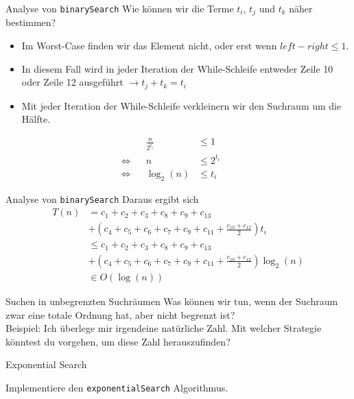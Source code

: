 \begin{frame}[fragile]{Analyse von \texttt{binarySearch}}
    Wie können wir die Terme $t_i$, $t_j$ und $t_k$ näher bestimmen?\pause\\ 
    \begin{itemize}
        \item Im Worst-Case finden wir das Element nicht, oder erst wenn \(left - right \leq 1\). 
        \item In diesem Fall wird in jeder Iteration der While-Schleife entweder Zeile 10 oder Zeile 12 ausgeführt $\rightarrow t_j + t_k = t_i$\pause 
        \item Mit jeder Iteration der While-Schleife verkleinern wir den Suchraum um die Hälfte. 
    \end{itemize}
    \begin{align*}
        &&\frac{n}{2^{t_i}} &\leq 1 &&
        \\\Leftrightarrow && n &\leq 2^{t_i} &&
        \\\Leftrightarrow &&\log_2(n) &\leq t_i && 
    \end{align*}
\end{frame}

\begin{frame}[fragile]{Analyse von \texttt{binarySearch}}
    Daraus ergibt sich
    \begin{align*}
        T(n) & = c_1+c_2+c_3+c_8+c_9 + c_{13} \\
             & + (c_4 + c_5 + c_6 + c_7 + c_9 + c_{11}+\frac{c_{10} + c_{12}}{2})t_i\\
             & \leq c_1+c_2+c_3+c_8+c_9 + c_{13} \\
             & + (c_4 + c_5 + c_6 + c_7 + c_9 + c_{11}+\frac{c_{10} + c_{12}}{2})\log_2(n)\\ 
             & \in O(\log(n)) 
    \end{align*}
\end{frame}

\begin{frame}{Suchen in unbegrenzten Suchräumen}
    Was können wir tun, wenn der Suchraum zwar eine totale Ordnung hat, aber nicht begrenzt ist?\\ 
    Beispiel: Ich überlege mir irgendeine natürliche Zahl. Mit welcher Strategie könntest du vorgehen, um diese Zahl herauszufinden? 
\end{frame}

\begin{frame}{Exponential Search}
    \begin{myexercise}\label{myexercise:exponentialsearch} 
        Implementiere den \texttt{exponentialSearch} Algorithmus. 
    \end{myexercise}
\end{frame}

